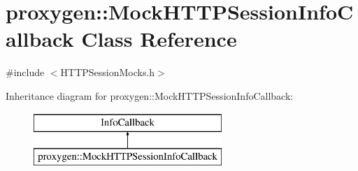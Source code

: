\section{proxygen\+:\+:Mock\+H\+T\+T\+P\+Session\+Info\+Callback Class Reference}
\label{classproxygen_1_1MockHTTPSessionInfoCallback}


{\ttfamily \#include $<$H\+T\+T\+P\+Session\+Mocks.\+h$>$}

Inheritance diagram for proxygen\+:\+:Mock\+H\+T\+T\+P\+Session\+Info\+Callback\+:\begin{figure}[H]
\begin{center}
\leavevmode
\includegraphics[height=2.000000cm]{classproxygen_1_1MockHTTPSessionInfoCallback}
\end{center}
\end{figure}

